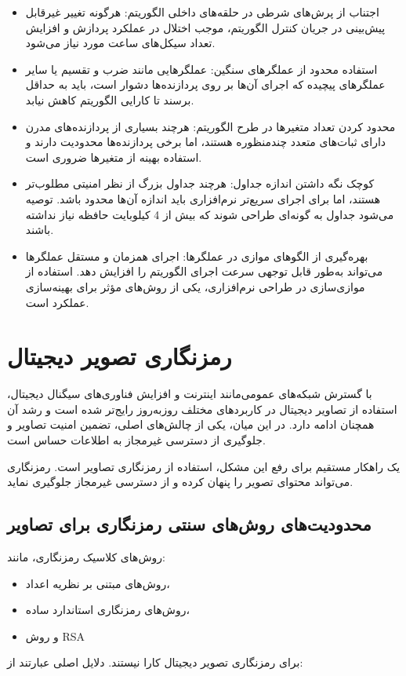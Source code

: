 \documentclass[a4paper,12pt]{report}
\renewcommand{\%}{\lr{\oldpercent}}
\providecommand{\lr}[1]{#1}
\begin{document}
\begin{itemize}
    \item اجتناب از پرش‌های شرطی در حلقه‌های داخلی الگوریتم: هرگونه تغییر غیرقابل پیش‌بینی در جریان کنترل الگوریتم، موجب اختلال در عملکرد پردازش و افزایش تعداد سیکل‌های ساعت مورد نیاز می‌شود.
    \item استفاده محدود از عملگرهای سنگین: عملگرهایی مانند ضرب و تقسیم یا سایر عملگرهای پیچیده که اجرای آن‌ها بر روی پردازنده‌ها دشوار است، باید به حداقل برسند تا کارایی الگوریتم کاهش نیابد.
    \item محدود کردن تعداد متغیرها در طرح الگوریتم: هرچند بسیاری از پردازنده‌های مدرن دارای ثبات‌های متعدد چندمنظوره هستند، اما برخی پردازنده‌ها محدودیت دارند و استفاده بهینه از متغیرها ضروری است.
    \item کوچک نگه داشتن اندازه جداول: هرچند جداول بزرگ از نظر امنیتی مطلوب‌تر هستند، اما برای اجرای سریع‌تر نرم‌افزاری باید اندازه آن‌ها محدود باشد. توصیه می‌شود جداول به گونه‌ای طراحی شوند که بیش از 4 کیلوبایت حافظه نیاز نداشته باشند.
    \item بهره‌گیری از الگوهای موازی در عملگرها: اجرای همزمان و مستقل عملگرها می‌تواند به‌طور قابل توجهی سرعت اجرای الگوریتم را افزایش دهد. استفاده از موازی‌سازی در طراحی نرم‌افزاری، یکی از روش‌های مؤثر برای بهینه‌سازی عملکرد است.
\end{itemize}

\section{رمزنگاری تصویر دیجیتال}
با گسترش شبکه‌های عمومی‌مانند اینترنت و افزایش فناوری‌های سیگنال دیجیتال، استفاده از تصاویر دیجیتال در کاربردهای مختلف روزبه‌روز رایج‌تر شده است و رشد آن همچنان ادامه دارد\cite{ref43}. در این میان، یکی از چالش‌های اصلی، تضمین امنیت تصاویر و جلوگیری از دسترسی غیرمجاز به اطلاعات حساس است.

یک راهکار مستقیم برای رفع این مشکل، استفاده از رمزنگاری تصاویر است. رمزنگاری می‌تواند محتوای تصویر را پنهان کرده و از دسترسی غیرمجاز جلوگیری نماید.

\subsection{محدودیت‌های روش‌های سنتی رمزنگاری برای تصاویر}
روش‌های کلاسیک رمزنگاری، مانند:
\begin{itemize}
    \item روش‌های مبتنی بر نظریه اعداد،
    \item روش‌های رمزنگاری استاندارد ساده،
    \item و روش \lr{RSA}
\end{itemize}
برای رمزنگاری تصویر دیجیتال کارا نیستند\cite{ref44}. دلایل اصلی عبارتند از:
\end{document}
